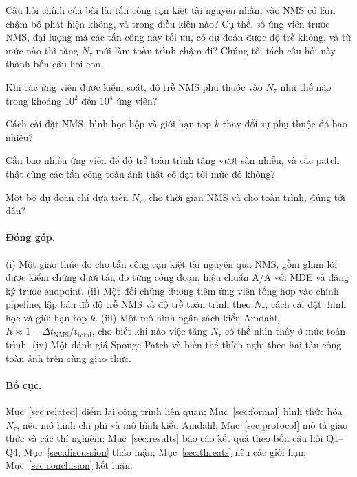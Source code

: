 \documentclass[a4paper,fleqn]{cas-dc}
\newcommand{\Ntau}{N_{\tau}}
\begin{document}
Câu hỏi chính của bài là: tấn công cạn kiệt tài nguyên nhắm vào NMS có làm chậm bộ phát hiện không, và trong điều kiện nào? Cụ thể, số ứng viên trước NMS, đại lượng mà các tấn công này tối ưu, có dự đoán được độ trễ không, và từ mức nào thì tăng $\Ntau$ mới làm toàn trình chậm đi? Chúng tôi tách câu hỏi này thành bốn câu hỏi con.
\begin{description}[leftmargin=2.5em,labelwidth=2.2em,itemsep=2pt]
\item[Q1] Khi các ứng viên được kiểm soát, độ trễ NMS phụ thuộc vào $\Ntau$ như thế nào trong khoảng $10^2$ đến $10^4$ ứng viên?
\item[Q2] Cách cài đặt NMS, hình học hộp và giới hạn top-$k$ thay đổi sự phụ thuộc đó bao nhiêu?
\item[Q3] Cần bao nhiêu ứng viên để độ trễ toàn trình tăng vượt sàn nhiễu, và các patch thật cùng các tấn công toàn ảnh thật có đạt tới mức đó không?
\item[Q4] Một bộ dự đoán chỉ dựa trên $\Ntau$, cho thời gian NMS và cho toàn trình, đúng tới đâu?
\end{description}

\paragraph{Đóng góp.}
(i) Một giao thức đo cho tấn công cạn kiệt tài nguyên qua NMS, gồm ghim lõi được kiểm chứng dưới tải, đo từng công đoạn, hiệu chuẩn A/A với MDE và đăng ký trước endpoint. (ii) Một đối chứng dương tiêm ứng viên tổng hợp vào chính pipeline, lập bản đồ độ trễ NMS và độ trễ toàn trình theo $\Ntau$, cách cài đặt, hình học và giới hạn top-$k$. (iii) Một mô hình ngân sách kiểu Amdahl, $R \approx 1 + \Delta t_{\mathrm{NMS}}/t_{\mathrm{total}}$, cho biết khi nào việc tăng $\Ntau$ có thể nhìn thấy ở mức toàn trình. (iv) Một đánh giá Sponge Patch và biến thể thích nghi theo hai tấn công toàn ảnh trên cùng giao thức.

\paragraph{Bố cục.}
Mục~\ref{sec:related} điểm lại công trình liên quan; Mục~\ref{sec:formal} hình thức hóa $\Ntau$, nêu mô hình chi phí và mô hình kiểu Amdahl; Mục~\ref{sec:protocol} mô tả giao thức và các thí nghiệm; Mục~\ref{sec:results} báo cáo kết quả theo bốn câu hỏi Q1--Q4; Mục~\ref{sec:discussion} thảo luận; Mục~\ref{sec:threats} nêu các giới hạn; Mục~\ref{sec:conclusion} kết luận.
\end{document}
